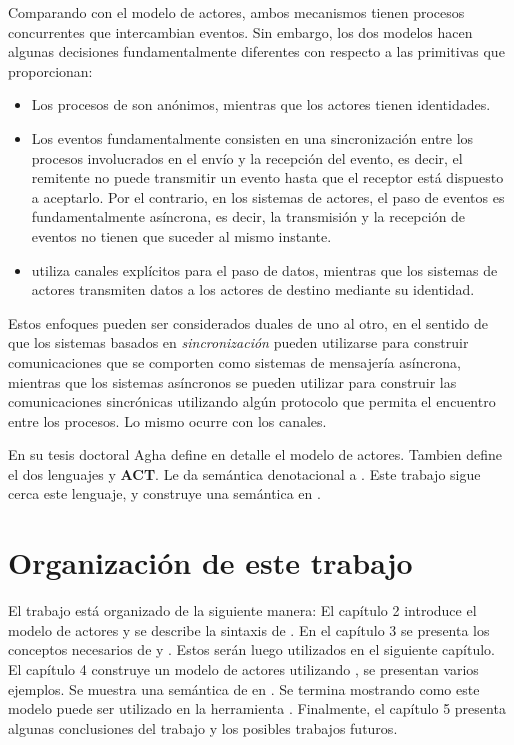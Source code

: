 Comparando \CSP con el modelo de actores, ambos mecanismos tienen procesos concurrentes que intercambian eventos. Sin embargo, los dos modelos hacen algunas decisiones fundamentalmente diferentes con respecto a las primitivas que proporcionan:

\begin{itemize}
\item Los procesos de \CSP son anónimos, mientras que los actores tienen identidades.
\item Los eventos fundamentalmente consisten en una sincronización entre los procesos involucrados en el envío y la recepción del evento, es decir, el remitente no puede transmitir un evento hasta que el receptor está dispuesto a aceptarlo. Por el contrario, en los sistemas de actores, el paso de eventos es fundamentalmente asíncrona, es decir, la transmisión y la recepción de eventos no tienen que suceder al mismo instante.
\item \CSP utiliza canales explícitos para el paso de datos, mientras que los sistemas de actores transmiten datos a los actores de destino mediante su identidad.
\end{itemize}

Estos enfoques pueden ser considerados duales de uno al otro, en el sentido de que los sistemas basados en \emph{sincronización} pueden utilizarse para construir comunicaciones que se comporten como sistemas de mensajería asíncrona, mientras que los sistemas asíncronos se pueden utilizar para construir las comunicaciones sincrónicas utilizando algún protocolo que permita el encuentro entre los procesos. Lo mismo ocurre con los canales.

En su tesis doctoral Agha\cite{Agha:1986:AMC:7929} define en detalle el modelo de actores. Tambien define el dos lenguajes \SAL y \textbf{ACT}. Le da semántica denotacional a \SAL. Este trabajo sigue cerca este lenguaje, y construye una semántica en \CSP.

\section{Organización de este trabajo}

El trabajo está organizado de la siguiente manera: El capítulo 2 introduce el modelo de actores y se describe la sintaxis de \SAL. En el capítulo 3 se presenta los conceptos necesarios de \CSP y \CSPm. Estos serán luego utilizados en el siguiente capítulo. El capítulo 4 construye un modelo de actores utilizando \CSP, se presentan varios ejemplos. Se muestra una semántica de \SAL en \CSP. Se termina mostrando como este modelo puede ser utilizado en la herramienta \FDR. Finalmente, el capítulo 5 presenta algunas conclusiones del trabajo y los posibles trabajos futuros.
